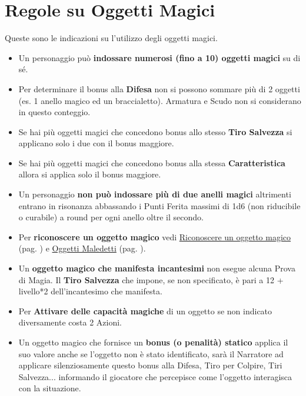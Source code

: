 \section{Regole su Oggetti Magici}\hypertarget{identificareom}{}\label{regoleoggettimagici}\hypertarget{regoleoggettimagici}{}

\begin{multicols}{2}

Queste sono le indicazioni su l'utilizzo degli oggetti magici.

\label{oggetti-magici}
\begin{itemize}[leftmargin=*] \setlength{\itemsep}{0pt}
\item
Un personaggio può \textbf{indossare numerosi (fino a 10) oggetti magici} su di sé.

\item Per determinare il bonus alla \textbf{Difesa} non si possono sommare più di 2 oggetti (es. 1 anello magico ed un braccialetto). Armatura e Scudo non si considerano in questo conteggio.
\item
Se hai più oggetti magici che concedono bonus allo stesso \textbf{Tiro Salvezza} si applicano solo i due con il bonus maggiore.
\item
Se hai più oggetti magici che concedono bonus alla stessa \textbf{Caratteristica} allora si applica solo il bonus maggiore.
\item
Un personaggio \textbf{non può indossare più di due anelli magici} altrimenti entrano in risonanza abbassando i Punti Ferita massimi di 1d6 (non riducibile o curabile) a round per ogni anello oltre il secondo. 
\item
Per \textbf{riconoscere un oggetto magico} vedi \hyperlink{rinoscereoggettomagico}{Riconoscere un oggetto magico} (pag. \pageref{rinoscereoggettomagico}) e \hyperlink{oggettimaledettiid}{Oggetti Maledetti} (pag. \pageref{oggettimaledettiid}).
\item
Un \textbf{oggetto magico che manifesta incantesimi} non esegue alcuna Prova di Magia. Il \textbf{Tiro Salvezza} che impone, se non specificato, è pari a 12 + livello*2 dell'incantesimo che manifesta.\label{tirosalvezzaincoggetto}
\item
Per \textbf{Attivare delle capacità magiche} di un oggetto se non indicato diversamente  costa 2 Azioni.
\item
Un oggetto magico che fornisce un \textbf{bonus (o penalità) statico} applica il suo valore anche se l'oggetto non è stato identificato, sarà il Narratore ad applicare silenziosamente questo bonus alla Difesa, Tiro per Colpire, Tiri Salvezza... informando il giocatore che percepisce come l'oggetto interagisca con la situazione.

\end{itemize}
\end{multicols}
